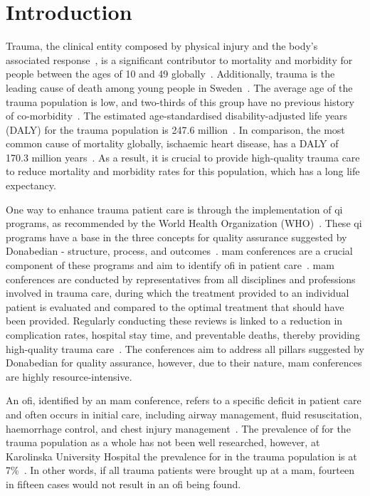 \documentclass[12pt, a4paper]{article}
\begin{document}
\section{Introduction}
Trauma, the clinical entity composed by physical injury and the body's associated response~\cite{gerdin_risk_2015}, is
a significant contributor to mortality and morbidity for people between the ages of 10 and 49
globally~\cite{roth_global_2018, vos_global_2020}. Additionally, trauma is the leading cause of death among young
people in Sweden~\cite{ sos_death_2021}. The average age of the trauma population is low, and two-thirds of this group
have no previous history of co-morbidity~\cite{brattstrom_socio-economic_2015}. The estimated age-standardised
disability-adjusted life years (DALY) for the trauma population is 247.6 million~\cite{haagsma_global_2016}. In
comparison, the most common cause of mortality globally, ischaemic heart disease, has a DALY of 170.3 million
years~\cite{wang_global_2021,roth_global_2018}. As a result, it is crucial to provide high-quality trauma care to
reduce mortality and morbidity rates for this population, which has a long life expectancy.

One way to enhance trauma patient care is through the implementation of \acrfull{qi} programs, as recommended by the
World Health Organization (WHO)~\cite{world_health_organization_guidelines_2009}. These \acrshort{qi} programs have a
base in the three concepts for quality assurance suggested by Donabedian - structure, process, and
outcomes~\cite{donabedian_effectiveness_1996}. \Acrfull{mam} conferences are a crucial component of these programs and
aim to identify \acrfull{ofi} in patient care~\cite{santana_development_2014}. \acrshort{mam} conferences are conducted
by representatives from all disciplines and professions involved in trauma care, during which the treatment provided to
an individual patient is evaluated and compared to the optimal treatment that should have been provided. Regularly
conducting these reviews is linked to a reduction in complication rates, hospital stay time, and preventable deaths,
thereby providing high-quality trauma care~\cite{stelfox_evidence_2011, mcdermott_trauma_1994}. The conferences aim to
address all pillars suggested by Donabedian for quality assurance, however, due to their nature, \acrshort{mam}
conferences are highly resource-intensive.

An \acrshort{ofi}, identified by an \acrshort{mam} conference, refers to a specific deficit in patient care and often
occurs in initial care, including airway management, fluid resuscitation, haemorrhage control, and chest injury
management~\cite{world_health_organization_guidelines_2009,roy_learning_2017,oreilly_opportunities_2013,sanddal_analysis_2011}.
The prevalence of  for the trauma population as a whole has not been well researched, however, at
Karolinska University Hospital the prevalence for  in the trauma population is at
7\%~\cite{attergrim_predicting_2023}. In other words, if all trauma patients were brought up at a \acrshort{mam},
fourteen in fifteen cases would not result in an \acrshort{ofi} being found.
\end{document}
